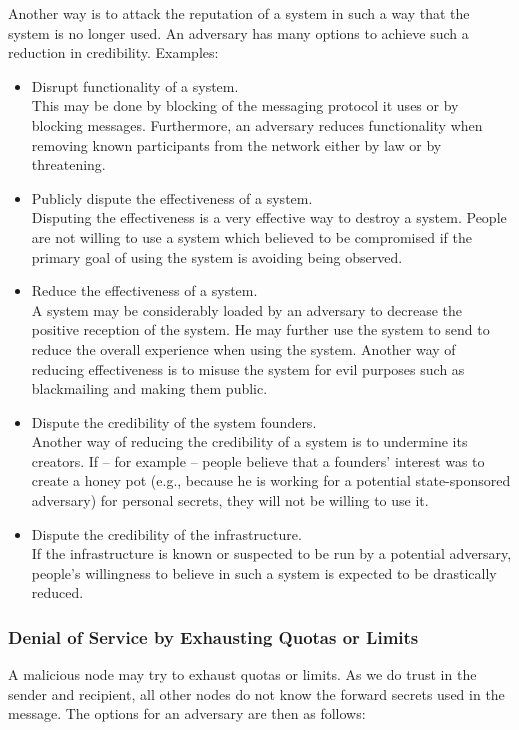 Another way is to attack the reputation of a system in such a way that the system is no longer used. An adversary has many options to achieve such a reduction in credibility. Examples:
\begin{itemize}
	\item Disrupt functionality of a system.\\ 
	This may be done by blocking of the messaging protocol it uses or by blocking messages. Furthermore, an adversary reduces functionality when removing known participants from the network either by law or by threatening.
	\item Publicly dispute the effectiveness of a system.\\
	Disputing the effectiveness is a very effective way to destroy a system. People are not willing to use a system which believed to be compromised if the primary goal of using the system is avoiding being observed.
	\item Reduce the effectiveness of a system.\\
	A system may be considerably loaded by an adversary to decrease the positive reception of the system. He may further use the system to send  to reduce the overall experience when using the system. Another way of reducing effectiveness is to misuse the system for evil purposes such as blackmailing and making them public.
	\item Dispute the credibility of the system founders.\\
	Another way of reducing the credibility of a system is to undermine its creators. If -- for example -- people believe that a founders' interest was to create a honey pot (e.g., because he is working for a potential state-sponsored adversary) for personal secrets, they will not be willing to use it.
	\item Dispute the credibility of the infrastructure.\\
	If the infrastructure is known or suspected to be run by a potential adversary, people's willingness to believe in such a system is expected to be drastically reduced.
\end{itemize}

\subsubsection{Denial of Service by Exhausting Quotas or Limits}
A malicious node may try to exhaust quotas or limits. As we do trust in the sender and recipient, all other nodes do not know the forward secrets used in the message. The options for an adversary are then as follows:

